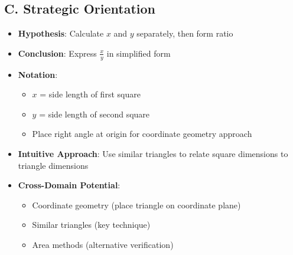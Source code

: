 \documentclass[]{article}
\begin{document}
\begin{problemconfigbox}
\subsection*{C. Strategic Orientation}
\begin{itemize}[leftmargin=*]
    \item \textbf{Hypothesis}: Calculate $x$ and $y$ separately, then form ratio
    \item \textbf{Conclusion}: Express $\frac{x}{y}$ in simplified form
    \item \textbf{Notation}: 
    \begin{itemize}
        \item $x$ = side length of first square
        \item $y$ = side length of second square
        \item Place right angle at origin for coordinate geometry approach
    \end{itemize}
    \item \textbf{Intuitive Approach}: Use similar triangles to relate square dimensions to triangle dimensions
    \item \textbf{Cross-Domain Potential}: 
    \begin{itemize}
        \item Coordinate geometry (place triangle on coordinate plane)
        \item Similar triangles (key technique)
        \item Area methods (alternative verification)
    \end{itemize}
\end{itemize}
\end{problemconfigbox}
\end{document}
